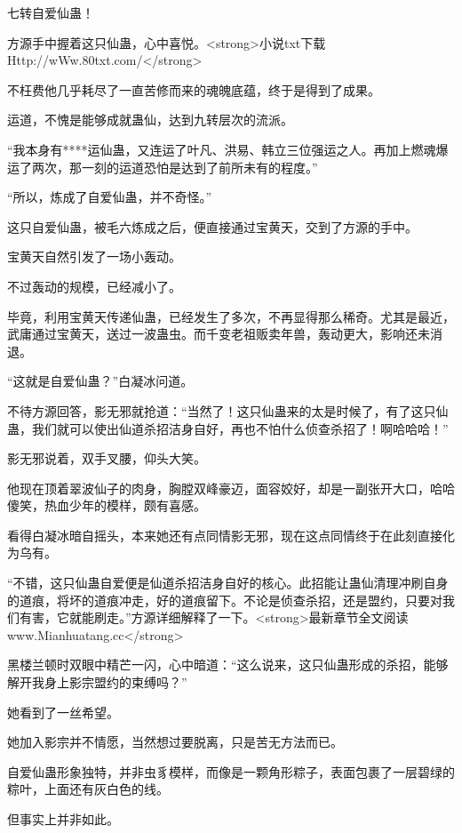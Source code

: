 
\begin{this_body}

七转自爱仙蛊！

方源手中握着这只仙蛊，心中喜悦。<strong>小说txt下载Http://wWw.80txt.com/</strong>

不枉费他几乎耗尽了一直苦修而来的魂魄底蕴，终于是得到了成果。

运道，不愧是能够成就蛊仙，达到九转层次的流派。

“我本身有****运仙蛊，又连运了叶凡、洪易、韩立三位强运之人。再加上燃魂爆运了两次，那一刻的运道恐怕是达到了前所未有的程度。”

“所以，炼成了自爱仙蛊，并不奇怪。”

这只自爱仙蛊，被毛六炼成之后，便直接通过宝黄天，交到了方源的手中。

宝黄天自然引发了一场小轰动。

不过轰动的规模，已经减小了。

毕竟，利用宝黄天传递仙蛊，已经发生了多次，不再显得那么稀奇。尤其是最近，武庸通过宝黄天，送过一波蛊虫。而千变老祖贩卖年兽，轰动更大，影响还未消退。

“这就是自爱仙蛊？”白凝冰问道。

不待方源回答，影无邪就抢道：“当然了！这只仙蛊来的太是时候了，有了这只仙蛊，我们就可以使出仙道杀招洁身自好，再也不怕什么侦查杀招了！啊哈哈哈！”

影无邪说着，双手叉腰，仰头大笑。

他现在顶着翠波仙子的肉身，胸膛双峰豪迈，面容姣好，却是一副张开大口，哈哈傻笑，热血少年的模样，颇有喜感。

看得白凝冰暗自摇头，本来她还有点同情影无邪，现在这点同情终于在此刻直接化为乌有。

“不错，这只仙蛊自爱便是仙道杀招洁身自好的核心。此招能让蛊仙清理冲刷自身的道痕，将坏的道痕冲走，好的道痕留下。不论是侦查杀招，还是盟约，只要对我们有害，它就能刷走。”方源详细解释了一下。<strong>最新章节全文阅读www.Mianhuatang.cc</strong>

黑楼兰顿时双眼中精芒一闪，心中暗道：“这么说来，这只仙蛊形成的杀招，能够解开我身上影宗盟约的束缚吗？”

她看到了一丝希望。

她加入影宗并不情愿，当然想过要脱离，只是苦无方法而已。

自爱仙蛊形象独特，并非虫豸模样，而像是一颗角形粽子，表面包裹了一层碧绿的粽叶，上面还有灰白色的线。

但事实上并非如此。


\end{this_body}
